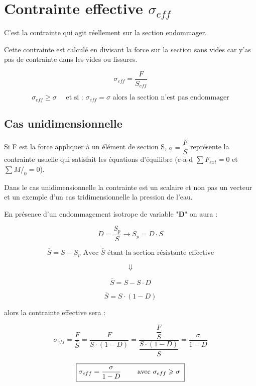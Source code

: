 \documentclass[12pt,a4paper]{report}
\renewcommand{\geq}{\geqslant}
\begin{document}
	
	\section{Contrainte effective $\sigma_{eff}$}
	
	C'est la contrainte qui agit réellement sur la section endommager.
	
	Cette contrainte est calculé en divisant la force sur la section sans vides car y'as pas de contrainte dans les vides ou fissures.
	
	\[ \sigma_{eff} = \dfrac{F}{S_{eff}} \]
	
	\[ \sigma_{eff} \geq \sigma \quad\text{ et si : } \sigma_{eff} = \sigma \text{ alors la section n'est pas endommager} \]
	
	\subsection{Cas unidimensionnelle}
	
	Si F est la force appliquer \`{a} un élément de section S, $\sigma = \dfrac{F}{S}$ représente la contrainte usuelle qui satisfait les équations d'équilibre \big(c-a-d $\sum F_{ext} = 0$ et $\sum M/_{0} = 0$\big).
	
	\vspace{\baselineskip}
	
	Dans le cas unidimensionnelle la contrainte est un scalaire et non pas un vecteur et un exemple d'un cas tridimensionnelle la pression de l'eau.
	
	\vspace{\baselineskip}
	
	En présence d'un endommagement isotrope de variable "\textbf{D}" on aura :
	
	\[ D = \dfrac{S_{p}}{S} \rightarrow S_{p} = D \cdot S \]
	
	\[ \overline{S} = S - S_{p} \text{ Avec $\overline{S}$ étant la section résistante effective} \]
	
	\[ \Downarrow \]
	
	\[ \overline{S} = S - S \cdot D \]
	
	\[ \overline{S} = S \cdot (1-D) \]
	
	alors la contrainte effective sera :
	
	\[ \sigma_{eff} = \dfrac{F}{\overline{S}} = \dfrac{F}{S \cdot (1-D)} = \dfrac{\dfrac{F}{S}}{\dfrac{S \cdot (1-D)}{S}} = \dfrac{\sigma}{1 - D} \]
	
	\[ \fbox{$\sigma_{eff} = \dfrac{\sigma}{1-D}$ \qquad avec $\sigma_{eff} \geq \sigma$ } \]
	
\end{document}

